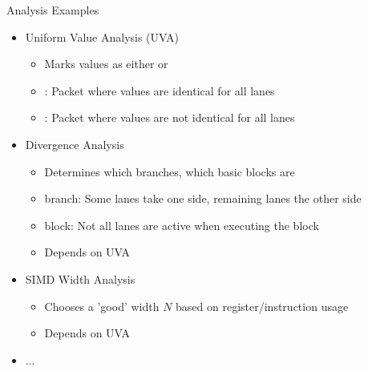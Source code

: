 \begin{frame}{Analysis Examples}

\begin{itemize}
    \item Uniform Value Analysis (UVA)
    \begin{itemize}
        \item Marks values as either  or 
        \item {}: Packet where values are identical for all lanes
        \item {}: Packet where values are not identical for all lanes
    \end{itemize}

    \item Divergence Analysis
    \begin{itemize}
        \item Determines which branches, which basic blocks are 
        \item {} branch: Some lanes take one side, remaining lanes the other side
        \item {} block: Not all lanes are active when executing the block
        \item Depends on UVA
    \end{itemize}
    
    \item SIMD Width Analysis
    \begin{itemize}
        \item Chooses a 'good' width $N$ based on register/instruction usage
        \item Depends on UVA
    \end{itemize}
    
    \item ...
\end{itemize}

\end{frame}


